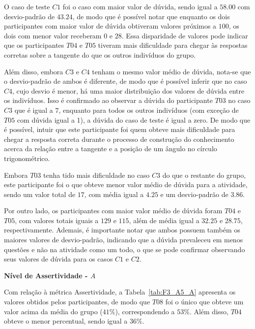 O caso de teste $C1$ foi o caso com maior valor de dúvida, sendo igual a $58.00$ com desvio-padrão de $43.24$, de modo que é possível notar que enquanto os dois participantes com maior valor de dúvida obtiveram valores próximos a $100$, os dois com menor valor receberam $0$ e $28$. Essa disparidade de valores pode indicar que os participantes $T04$ e $T05$ tiveram mais dificuldade para chegar às respostas corretas sobre a tangente do que os outros indivíduos do grupo. 

Além disso, embora $C3$ e $C4$ tenham o mesmo valor médio de dúvida, nota-se que o desvio-padrão de ambos é diferente, de modo que é possível inferir que no caso $C4$, cujo desvio é menor, há uma maior distribuição dos valores de dúvida entre os indivíduos. Isso é confirmado ao observar a dúvida do participante $T03$ no caso $C3$ que é igual a $7$, enquanto para todos os outros indivíduos (com exceção de $T05$ com dúvida igual a 1), a dúvida do caso de teste é igual a zero. De modo que é possível, intuir que este participante foi quem obteve mais dificuldade para chegar a resposta correta durante o processo de construção do conhecimento acerca da relação entre a tangente e a posição de um ângulo no círculo trigonométrico.

Embora $T03$ tenha tido mais dificuldade no caso $C3$ do que o restante do grupo, este participante foi o que obteve menor valor médio de dúvida para a atividade, sendo um valor total de $17$, com média igual a $4.25$ e um desvio-padrão de $3.86$. 

Por outro lado, os participantes com maior valor médio de dúvida foram $T04$ e $T05$, com valores totais iguais a $129$ e $115$, além de média igual a $32.25$ e $28.75$, respectivamente. Ademais, é importante notar que ambos possuem também os maiores valores de desvio-padrão, indicando que a dúvida prevaleceu em menos questões e não na atividade como um todo, o que se pode confirmar observando seus valores de dúvida para os casos $C1$ e $C2$.

\textbf{Nível de Assertividade - $A$}

Com relação à métrica Assertividade, a Tabela~\ref{tab:F3_A5_A} apresenta os valores obtidos pelos participantes, de modo que $T08$ foi o único que obteve um valor acima da média do grupo ($41\%$), correspondendo a $53\%$. Além disso, $T04$ obteve o menor percentual, sendo igual a $36\%$.

